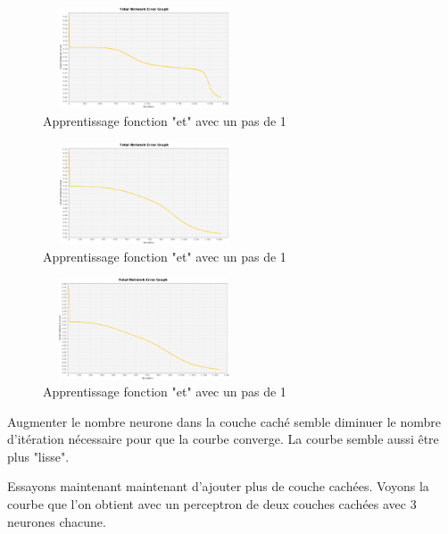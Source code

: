 \documentclass[twoside,openright,a4paper,11pt,french]{article}
\begin{document}
\begin{figure}[h]
\includegraphics[width=6cm,height=3cm]{./pics/eq/multi-5_eq_def.eps}
\caption{Apprentissage fonction "et" avec un pas de 1}
\label{fig:anderr4}
\end{figure}

\begin{figure}[h]
\includegraphics[width=6cm,height=3cm]{./pics/eq/multi-10_eq_def.eps}
\caption{Apprentissage fonction "et" avec un pas de 1}
\label{fig:anderr4}
\end{figure}

\begin{figure}[h]
\includegraphics[width=6cm,height=3cm]{./pics/eq/multi-20_eq_def.eps}
\caption{Apprentissage fonction "et" avec un pas de 1}
\label{fig:anderr4}
\end{figure}


Augmenter le nombre neurone dans la couche caché semble diminuer le nombre
d'itération nécessaire pour que la courbe converge.
La courbe semble aussi être plus "lisse".

Essayons maintenant maintenant d'ajouter plus de couche cachées. Voyons la
courbe que l'on obtient avec un perceptron de deux couches cachées avec 3 
neurones chacune.
\end{document}
